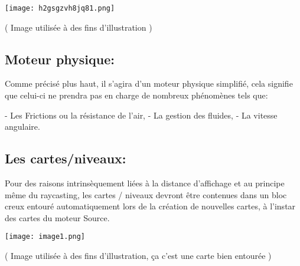 \documentclass[french, 12pt]{article}
\begin{document}
    \begin{center}
            \texttt{[image: h2gsgzvh8jq81.png]}
            
            \tiny\color{gray}( Image utilisée à des fins d’illustration )
    \end{center}
    \newpage


    \color{black}\begin{flushleft}
    
        \subsection{Moteur physique:}
        \vspace*{1mm}

        Comme précisé plus haut, il s’agira d’un moteur physique simplifié, cela signifie que celui-ci ne prendra pas en charge de nombreux phénomènes tels que: \newline

        \hspace*{6mm}  - Les Frictions ou la résistance de l’air, \newline
        \hspace*{6mm}  - La gestion des fluides, \newline
        \hspace*{6mm}  - La vitesse angulaire. 

        \subsection{Les cartes/niveaux:}
        \vspace*{1mm}

        Pour des raisons intrinsèquement liées à la distance d’affichage et au principe même du raycasting, les cartes / niveaux devront être contenues dans un bloc creux entouré automatiquement lors de la création de nouvelles cartes, à l’instar des cartes du moteur Source.

        
    \end{flushleft}
    \begin{center}
            \texttt{[image: image1.png]}
            
            \tiny\color{gray}( Image utilisée à des fins d’illustration, ça c'est une carte bien entourée )
    \end{center}
    \newpage
\end{document}
